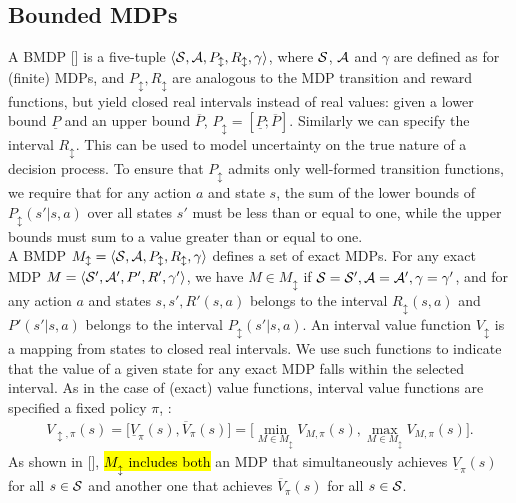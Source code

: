 \subsection{Bounded \ac{MDPs}} \label{subsec:bmdp}
A \acf{BMDP} [\cite{givan2000bounded}] is a five-tuple $\langle \mathcal{S}, \mathcal{A}, P_{\updownarrow}, R_{\updownarrow}, \gamma \rangle$, where $\mathcal{S}$, $\mathcal{A}$ and $\gamma$ are defined as for (finite) MDPs, and $P_{\updownarrow}, R_{\updownarrow}$ are analogous to the MDP transition and reward functions, but yield closed real intervals instead of real values: given a lower bound $\underline{P}$ and an upper bound $\overline{P}$, $P_{\updownarrow} = [\underline{P}; \overline{P}]$. Similarly we can specify the interval $R_{\updownarrow}$. This can be used to model uncertainty on the true nature of a decision process. To ensure that $P_{\updownarrow}$ admits only well-formed transition functions, we require that for any action $a$ and state $s$, the sum of the lower bounds of $P_{\updownarrow}(s'|s,a)$ over all states $s'$ must be less than or equal to one, while the upper bounds must sum to a value greater than or equal to one.\\
\newline
A BMDP $M_{\updownarrow} = \langle \mathcal{S}, \mathcal{A}, P_{\updownarrow}, R_{\updownarrow}, \gamma \rangle$ defines a set of exact MDPs. For any exact MDP $M = \langle \mathcal{S}', \mathcal{A}', P', R', \gamma' \rangle$, we have $M \in M_{\updownarrow}$ if $\mathcal{S} = \mathcal{S}', \mathcal{A} = \mathcal{A}', \gamma = \gamma'$, and for any action $a$ and states $s, s', R'(s,a)$ belongs to the interval $R_{\updownarrow}(s,a)$ and $P'(s'|s,a)$ belongs to the interval $P_{\updownarrow}(s'|s,a)$. An interval value function $V_{\updownarrow}$ is a mapping from states to closed real intervals. We use such functions to indicate that the value of a given state for any exact MDP falls within the selected interval. As in the case of (exact) value functions, interval value functions are specified \wrt a fixed policy $\pi$, \ie:
\begin{align} V_{\updownarrow, \pi}(s) = \Big[ \underline{V}_{\pi}(s), \overline{V}_{\pi}(s)\Big] = \Big[ \min_{M \in M_{\updownarrow}} V_{M,\pi}(s), \max_{M \in M_{\updownarrow}} V_{M,\pi}(s)\Big]. \end{align}
As shown in [\cite{givan2000bounded}], \hl{$M_{\updownarrow}$ includes both} an \ac{MDP} that simultaneously achieves $\underline{V}_{\pi}(s)$ for all $s \in \mathcal{S}$ and another one that achieves $\overline{V}_{\pi}(s)$ for all $s \in \mathcal{S}$.\\
